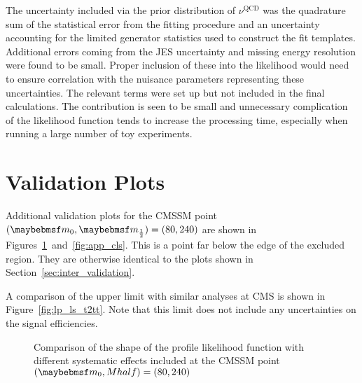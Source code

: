 The uncertainty included via the prior distribution of $\nu^{\textrm{QCD}}$ was
the quadrature sum of the statistical error from the fitting procedure and an
uncertainty accounting for the limited generator statistics used to construct
the fit templates. Additional errors coming from the \ac{JES} uncertainty and
missing energy resolution were found to be small. Proper inclusion of these into
the likelihood would need to ensure correlation with the nuisance parameters
representing these uncertainties. The relevant terms were set up but not
included in the final calculations. The contribution is seen to be small and
unnecessary complication of the likelihood function tends to increase the
processing time, especially when running a large number of toy experiments.

\section{Validation Plots}
\label{sec:app_inter_validation}
Additional validation plots for the \ac{CMSSM} point $(\Mzero, \Mhalf) = (80,
240)$ are shown in Figures~\ref{fig:app_pl}~and~\ref{fig:app_cls}. This is a
point far below the edge of the excluded region. They are otherwise identical to
the plots shown in Section~\ref{sec:inter_validation}.

A comparison of the \Ttwott upper limit with similar analyses at \ac{CMS} is
shown in Figure~\ref{fig:lp_ls_t2tt}. Note that this limit does not include any
uncertainties on the signal efficiencies.

\begin{figure}
\centering
{}\quad
{}
\caption{Comparison of the shape of the profile likelihood function with
  different systematic effects included at the \ac{CMSSM} point $(\Mzero, Mhalf)
  = (80, 240)$}
\label{fig:app_pl}
\end{figure}


